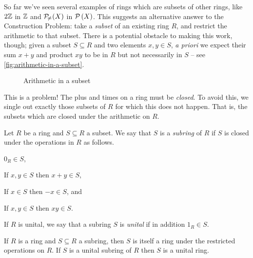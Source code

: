 So far we've seen several examples of rings which are subsets of other rings, like \(2\mathbb{Z}\) in \(\mathbb{Z}\) and \(\mathcal{P}_{\!\neq\!}\left(X\right)\) in \(\mathcal{P}\left(X\right)\).
This suggests an alternative answer to the Construction Problem: take a \emph{subset} of an existing ring \(R\), and restrict the arithmetic to that subset.
There is a potential obstacle to making this work, though; given a subset \(S \subseteq R\) and two elements \(x,y \in S\), \emph{a priori} we expect their sum \(x+y\) and product \(xy\) to be in \(R\) but not necessarily in \(S\) -- see \autoref{fig:arithmetic-in-a-subset}.
\begin{figure}[h!]
\begin{center}
\caption{Arithmetic in a subset \label{fig:arithmetic-in-a-subset}}
\end{center}
\end{figure}
This is a problem!
The plus and times on a ring must be \emph{closed}.
To avoid this, we single out exactly those subsets of \(R\) for which this does not happen.
That is, the subsets which are closed under the arithmetic on \(R\).

\begin{dfn}[Subring] \label{dfn:subring}
Let \(R\) be a ring and \(S \subseteq R\) a subset.
We say that \(S\) is a \emph{subring} of \(R\) if \(S\) is closed under the operations in \(R\) as follows.
\begin{proplist*}
\item \label{dfn:subring:zero} \(0_R \in S\),
\item \label{dfn:subring:plus} If \(x,y \in S\) then \(x+y \in S\),
\item \label{dfn:subring:neg} If \(x \in S\) then \(-x \in S\), and
\item \label{dfn:subring:times} If \(x,y \in S\) then \(xy \in S\).
\end{proplist*}
If \(R\) is unital, we say that a subring \(S\) is \emph{unital} if in addition \(1_R \in S\).
\end{dfn}

\begin{prop} \label{prop:subring-is-ring}
If \(R\) is a ring and \(S \subseteq R\) a subring, then \(S\) is itself a ring under the restricted operations on \(R\).
If \(S\) is a unital subring of \(R\) then \(S\) is a unital ring.
\end{prop}

